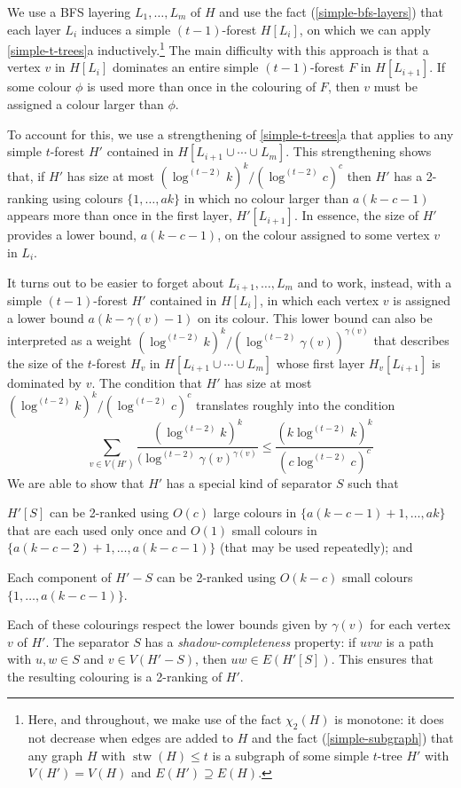 \documentclass[kpfonts]{patmorin}
\DeclareMathOperator{\stw}{stw}
\newcommand{\trn}{\chi_2}
\theoremstyle{named}
\newcommand{\weirdref}[2]{\cref{#1}#2}
\begin{document}
We use a BFS layering $L_1,\ldots,L_m$ of $H$ and use the fact (\cref{simple-bfs-layers}) that each layer $L_i$ induces a simple $(t-1)$-forest $H[L_i]$, on which we can apply \weirdref{simple-t-trees}{a} inductively.\footnote{Here, and throughout, we make use of the fact $\trn(H)$ is monotone: it does not decrease when edges are added to $H$ and the fact (\cref{simple-subgraph}) that any graph $H$ with $\stw(H)\le t$ is a subgraph of some simple $t$-tree $H'$ with $V(H')=V(H)$ and $E(H')\supseteq E(H)$.}  The main difficulty with this approach is that a vertex $v$ in $H[L_i]$ dominates an entire simple $(t-1)$-forest $F$ in $H[L_{i+1}]$.  If some colour $\phi$ is used more than once in the colouring of $F$, then $v$ must be assigned a colour larger than $\phi$.

To account for this, we use a strengthening of \weirdref{simple-t-trees}{a} that applies to any simple $t$-forest $H'$ contained in $H[L_{i+1}\cup\cdots\cup L_m]$.  This strengthening shows that, if $H'$ has size at most $(\log^{(t-2)} k)^k/(\log^{(t-2)} c)^c$ then $H'$ has a 2-ranking using colours $\{1,\ldots,ak\}$ in which no colour larger than $a(k-c-1)$ appears more than once in the first layer, $H'[L_{i+1}]$.  In essence, the size of $H'$ provides a lower bound, $a(k-c-1)$, on the colour assigned to some vertex $v$ in $L_i$.

It turns out to be easier to forget about $L_{i+1},\ldots,L_{m}$ and to work, instead, with a simple $(t-1)$-forest $H'$ contained in $H[L_i]$, in which each vertex $v$ is assigned a lower bound $a(k-\gamma(v)-1)$ on its colour.  This lower bound can also be interpreted as a weight  $(\log^{(t-2)}k)^k/(\log^{(t-2)}\gamma(v))^{\gamma(v)}$ that describes the size of the $t$-forest $H_v$ in $H[L_{i+1}\cup\cdots\cup L_m]$ whose first layer $H_v[L_{i+1}]$ is dominated by $v$.  The condition that $H'$ has size at most $(\log^{(t-2)} k)^k/(\log^{(t-2)} c)^c$ translates roughly into the condition
\[
   \sum_{v\in V(H')}\frac{(\log^{(t-2)}k)^k}{(\log^{(t-2)}\gamma(v)^{\gamma(v)}} \le \frac{(k\log^{(t-2)} k)^k}{(c\log^{(t-2)} c)^c}
\]
We are able to show that $H'$ has a special kind of separator $S$ such that
\begin{compactenum}
    \item $H'[S]$ can be 2-ranked using $O(c)$ large colours in $\{a(k-c-1)+1,\ldots,ak\}$ that are each used only once and $O(1)$ small colours in $\{a(k-c-2)+1,\ldots,a(k-c-1)\}$ (that may be used repeatedly); and
    \item Each component of $H'-S$ can be 2-ranked using $O(k-c)$ small colours $\{1,\ldots,a(k-c-1)\}$.
\end{compactenum}
Each of these colourings respect the lower bounds given by $\gamma(v)$ for each vertex $v$ of $H'$.  The separator $S$ has a \emph{shadow-completeness} property: if $uvw$ is a path with $u,w\in S$ and $v\in V(H'-S)$, then $uw\in E(H'[S])$.  This ensures that the resulting colouring is a 2-ranking of $H'$.
\end{document}
